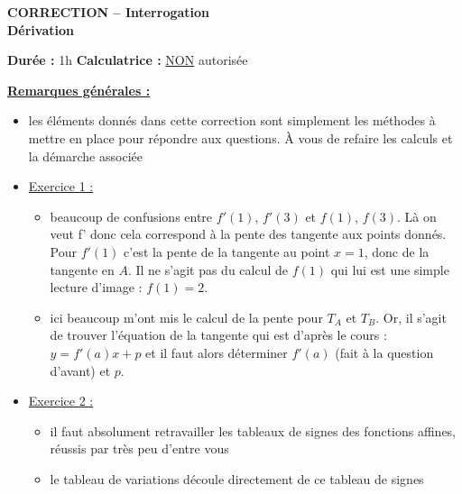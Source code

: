 \documentclass[12pt,a4paper]{exam}
\begin{document}
\begin{center}
    \Large\textbf{CORRECTION -- Interrogation\\Dérivation}
\end{center}

\vspace{0.3cm}

\noindent
\textbf{Durée :} 1h \hfill
\textbf{Calculatrice :} \underline{NON} autorisée

\vspace{0.5cm}

{\color{red}
\underline{\textbf{Remarques générales :}}

\vspace{5pt}
\begin{itemize}
    \item les éléments donnés dans cette correction sont simplement les méthodes à mettre 
    en place pour répondre aux questions. À vous de refaire les calculs et la démarche associée
    \item \underline{Exercice 1 :}
    \begin{itemize}
        \item beaucoup de confusions entre $f'(1)$, $f'(3)$ et $f(1)$, $f(3)$. Là on veut f' donc 
        cela correspond à la pente des tangente aux points donnés. Pour $f'(1)$ c'est la 
        pente de la tangente au point $x=1$, donc de la tangente en $A$. Il ne s'agit pas du calcul
        de $f(1)$ qui lui est une simple lecture d'image : $f(1) = 2$.
        \item ici beaucoup m'ont mis le calcul de la pente pour $T_A$ et $T_B$. Or, il s'agit de trouver 
        l'équation de la tangente qui est d'après le cours : $y = f'(a)x + p$ et il faut alors déterminer $f'(a)$
        (fait à la question d'avant) et $p$.
    \end{itemize}
    \item \underline{Exercice 2 :}
    \begin{itemize}
        \item il faut absolument retravailler les tableaux de signes des fonctions affines, 
        réussis par très peu d'entre vous
        \item le tableau de variations découle directement de ce tableau de signes
    \end{itemize}
\end{itemize}
}
\end{document}
